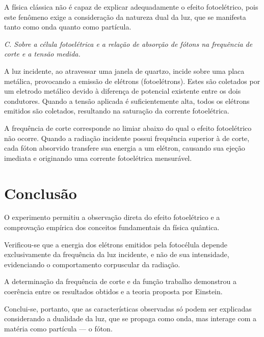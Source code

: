 \documentclass[10pt,twocolumn,letterpaper]{article}
\begin{document}
\hspace{1cm} A física clássica não é capaz de explicar adequadamente o efeito fotoelétrico, pois este fenômeno exige a consideração da natureza dual da luz, que se manifesta tanto como onda quanto como partícula.

\noindent\textit{C. Sobre a célula fotoelétrica e a relação de absorção de
fótons na frequência de corte e a tensão medida.}

\hspace{1cm} A luz incidente, ao atravessar uma janela de quartzo, incide sobre uma placa metálica, provocando a emissão de elétrons (fotoelétrons). Estes são coletados por um eletrodo metálico devido à diferença de potencial existente entre os dois condutores.
Quando a tensão aplicada é suficientemente alta, todos os elétrons emitidos são coletados, resultando na saturação da corrente fotoelétrica.

\hspace{1cm} A frequência de corte corresponde ao limiar abaixo do qual o efeito fotoelétrico não ocorre. Quando a radiação incidente possui frequência superior à de corte, cada fóton absorvido transfere sua energia a um elétron, causando sua ejeção imediata e originando uma corrente fotoelétrica mensurável.


\section{Conclusão}

\hspace{1cm} O experimento permitiu a observação direta do efeito fotoelétrico e a comprovação empírica dos conceitos fundamentais da física quântica.

\hspace{1cm} Verificou-se que a energia dos elétrons emitidos pela fotocélula depende exclusivamente da frequência da luz incidente, e não de sua intensidade, evidenciando o comportamento corpuscular da radiação.

\hspace{1cm} A determinação da frequência de corte e da função trabalho demonstrou a coerência entre os resultados obtidos e a teoria proposta por Einstein.

\hspace{1cm} Conclui-se, portanto, que as características observadas só podem ser explicadas considerando a dualidade da luz, que se propaga como onda, mas interage com a matéria como partícula — o fóton.
\end{document}

